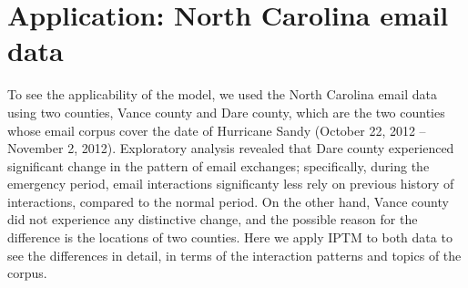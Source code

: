 \documentclass[a4paper]{article}
\begin{document}
\section{Application: North Carolina email data}
To see the applicability of the model, we used the North Carolina email data using two counties, Vance county and Dare county, which are the two counties whose email corpus cover the date of Hurricane Sandy (October 22, 2012 – November 2, 2012). Exploratory analysis revealed that Dare county experienced significant change in the pattern of email exchanges; specifically, during the emergency period, email interactions significanty less rely on previous history of interactions, compared to the normal period. On the other hand, Vance county did not experience any distinctive change, and the possible reason for the difference is the locations of two counties. Here we apply IPTM to both data to see the differences in detail, in terms of the interaction patterns and topics of the corpus.
\end{document}
